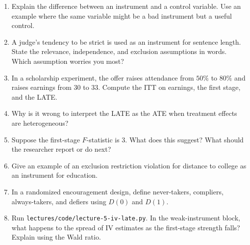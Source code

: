 \begin{enumerate}
  \item Explain the difference between an instrument and a control variable.
  Use an example where the same variable might be a bad instrument but a useful
  control.

  \item A judge's tendency to be strict is used as an instrument for sentence
  length. State the relevance, independence, and exclusion assumptions in
  words. Which assumption worries you most?

  \item In a scholarship experiment, the offer raises attendance from $50\%$
  to $80\%$ and raises earnings from $30$ to $33$. Compute the ITT on earnings,
  the first stage, and the LATE.

  \item Why is it wrong to interpret the LATE as the ATE when treatment effects
  are heterogeneous?

  \item Suppose the first-stage $F$-statistic is $3$. What does this suggest?
  What should the researcher report or do next?

  \item Give an example of an exclusion restriction violation for distance to
  college as an instrument for education.

  \item In a randomized encouragement design, define never-takers, compliers,
  always-takers, and defiers using $D(0)$ and $D(1)$.

  \item Run \texttt{lectures/code/lecture-5-iv-late.py}. In the weak-instrument
  block, what happens to the spread of IV estimates as the first-stage strength
  falls? Explain using the Wald ratio.
\end{enumerate}


